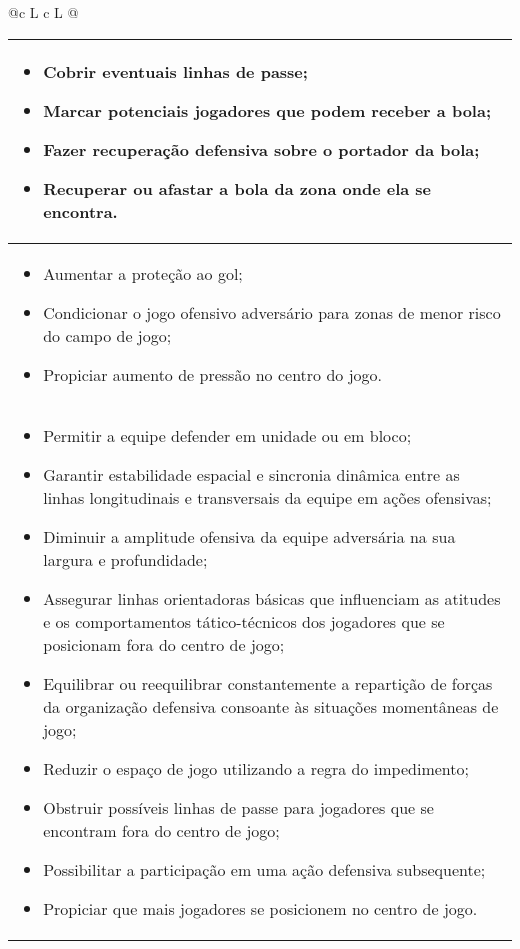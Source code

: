 \documentclass{article}
\begin{document}
\begin{table}[p]
\begin{tabularx}{\linewidth}{@{}c L c L @{}}
\begin{tabular}[b]{@{}>{\centering\arraybackslash}p{\linewidth}@{}}
\begin{itemize}
           \item Cobrir eventuais linhas de passe;
           \item Marcar potenciais jogadores que podem receber a bola;
           \item Fazer recuperação defensiva sobre o portador da bola;
           \item Recuperar ou afastar a bola da zona onde ela se encontra.
           \end{itemize}    \\
           \midrule
                \thead{Concentração}
           \begin{itemize}
           \item Aumentar a proteção ao gol;
           \item Condicionar o jogo ofensivo adversário para zonas de menor risco do campo de jogo;
           \item Propiciar aumento de pressão no centro do jogo.
           \end{itemize}    \\
           \midrule
                \thead{Unidade defensiva}
           \begin{itemize}
           \item Permitir a equipe defender em unidade ou em bloco;
           \item Garantir estabilidade espacial e sincronia dinâmica entre as linhas longitudinais e transversais da equipe em ações ofensivas;
           \item Diminuir a amplitude ofensiva da equipe adversária na sua largura e profundidade;
           \item Assegurar linhas orientadoras básicas que influenciam as atitudes e os comportamentos tático-técnicos dos jogadores que se posicionam fora do centro de jogo;
           \item Equilibrar ou reequilibrar constantemente a repartição de forças da organização defensiva consoante às situações momentâneas de jogo;
           \item Reduzir o espaço de jogo utilizando a regra do impedimento;
           \item Obstruir  possíveis linhas de passe para jogadores que se encontram  fora do centro de jogo;
           \item Possibilitar a participação em uma ação defensiva subsequente;
           \item Propiciar que mais jogadores se posicionem no centro de jogo.
           \end{itemize}
           \end{tabular}    \\
           \bottomrule
\end{tabularx}
\end{table}
\end{document}
